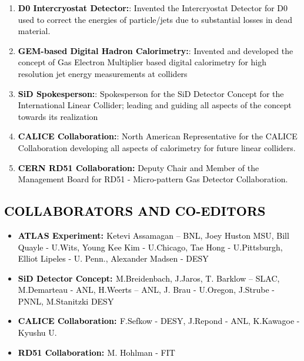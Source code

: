 \begin{enumerate}

\item {
\textbf{\textcolor{black}{D0 Intercryostat Detector:}}\textcolor{black}{: Invented the Intercryostat Detector for D0 used to 
correct the energies of particle/jets due to substantial losses in dead material. }}

\item {
\textbf{\textcolor{black}{GEM-based Digital Hadron Calorimetry:}}\textcolor{black}{: Invented and developed the concept of Gas Electron Multiplier
based digital calorimetry for high resolution jet energy measurements at colliders} }

\item {
\textbf{\textcolor{black}{SiD Spokesperson:}}\textcolor{black}{: Spokesperson for the SiD Detector Concept for the International 
Linear Collider; leading and guiding all aspects of the concept towards its realization}}

\item {
\textbf{\textcolor{black}{CALICE Collaboration:}}\textcolor{black}{: North American Representative for the CALICE Collaboration
developing all aspects of calorimetry for future linear colliders}.}

\item {
\textbf{\textcolor{black}{CERN RD51 Collaboration:}}\textcolor{black}{ Deputy Chair and Member of the Management Board for RD51
 - Micro-pattern Gas Detector Collaboration.}}
 
\end{enumerate}

\subsection[COLLABORATORS AND CO{}-EDITORS]{{\textcolor{black}{COLLABORATORS AND
CO-EDITOR}}\textcolor{black}{S}}
\begin{itemize}
\item {
\textbf{\textcolor{black}{ATLAS Experiment: }}\textcolor{black}{Ketevi Assamagan – BNL, Joey Huston MSU, Bill Quayle - U.Wits, Young Kee Kim - U.Chicago, Tae Hong - U.Pittsburgh, Elliot Lipeles - U. Penn., Alexander Madsen - DESY }}

\item {
\textbf{\textcolor{black}{SiD Detector Concept: }}\textcolor{black}{M.Breidenbach, J.Jaros, T. Barklow – SLAC, M.Demarteau - ANL, 
H.Weerts – ANL, J. Brau - U.Oregon, J.Strube - PNNL, M.Stanitzki DESY}}

\item {
\textbf{\textcolor{black}{CALICE Collaboration: }}\textcolor{black}{F.Sefkow - DESY, J.Repond - ANL, K.Kawagoe - Kyushu U.}}

\item {
\textbf{\textcolor{black}{RD51 Collaboration: }}\textcolor{black}{M. Hohlman - FIT}}
\end{itemize}

